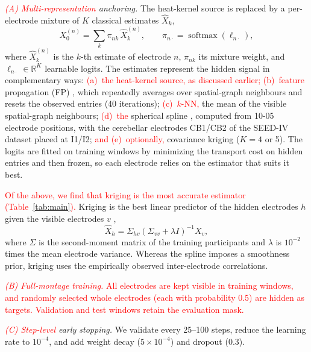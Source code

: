 \documentclass{article}
\begin{document}
\emph{\textcolor{red}{(A) Multi-representation} anchoring.} The heat-kernel source is
replaced by a per-electrode mixture of $K$ classical estimates $\hat X_k$,
\begin{equation}
X_0^{(n)}=\textstyle\sum_k \pi_{nk}\,\hat X_k^{(n)},\qquad
\pi_{n\cdot}=\operatorname{softmax}(\ell_{n\cdot}),
\end{equation}
where $\hat X_k^{(n)}$ is the $k$-th estimate of electrode $n$, $\pi_{nk}$
its mixture weight, and $\ell_{n\cdot}\in\mathbb{R}^K$ learnable logits.
The estimates represent the hidden signal in complementary ways:
\textcolor{red}{(a)~the heat-kernel source, as discussed earlier; (b)~feature} propagation
(FP) \cite{rossi2022unreasonable}, which repeatedly averages over
spatial-graph neighbours and resets the observed entries (40 iterations);
\textcolor{red}{(c)~$k$-NN,} the mean of the visible spatial-graph neighbours; \textcolor{red}{(d)~the}
spherical spline \cite{perrin1989spherical}, computed from 10-05 electrode
positions, with the cerebellar electrodes CB1/CB2 of the SEED-IV dataset
placed at I1/I2; \textcolor{red}{and (e)~optionally,} covariance kriging ($K=4$ or 5). The
logits are fitted on training windows by minimizing the transport cost on
hidden entries and then frozen, so each electrode relies on the estimator
that suits it best.

\textcolor{red}{Of the above, we find that kriging is the most accurate estimator
(Table~\ref{tab:main}).} Kriging is the best linear predictor of the hidden
electrodes $h$ given the visible electrodes $v$ \cite{cressie1993statistics},
\begin{equation}
\label{eq:kriging}
\hat X_h=\Sigma_{hv}(\Sigma_{vv}+\lambda I)^{-1}X_v,
\end{equation}
where $\Sigma$ is the second-moment matrix of the training participants
and $\lambda$ is $10^{-2}$ times the mean electrode variance. Whereas the
spline imposes a smoothness prior, kriging uses the empirically observed
inter-electrode correlations.

\textcolor{red}{\emph{(B) Full-montage training.} All electrodes are kept visible in
training windows, and randomly selected whole electrodes (each with
probability 0.5) are hidden as targets. Validation and test windows retain
the evaluation mask.}

\emph{\textcolor{red}{(C) Step-level} early stopping.} We validate every 25--100 steps,
reduce the learning rate to $10^{-4}$, and add weight decay
($5\times10^{-4}$) and dropout (0.3).
\end{document}
